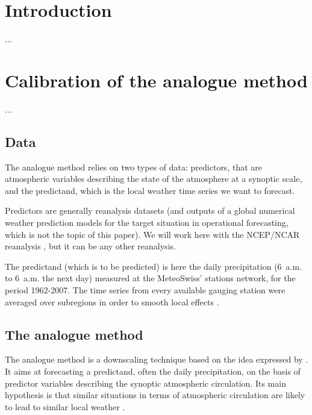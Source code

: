 \documentclass{ametsoc}
\begin{document}


\section{Introduction}
...
\cite{Horton2012a}


\section{Calibration of the analogue method}
...

\subsection{Data}

The analogue method relies on two types of data: predictors, that are atmospheric variables describing the state of the atmosphere at a synoptic scale, and the predictand, which is the local weather time series we want to forecast.

Predictors are generally reanalysis datasets (and outputs of a global numerical weather prediction models for the target situation in operational forecasting, which is not the topic of this paper). We will work here with the NCEP/NCAR reanalysis \citep[6-hourly, 17 atmospheric levels at a resolution of 2.5\degree, see][]{Kalnay1996}, but it can be any other reanalysis.

The predictand (which is to be predicted) is here the daily precipitation (6~a.m. to 6~a.m. the next day) measured at the MeteoSwiss' stations network, for the period 1962-2007. The time series from every available gauging station were averaged over subregions in order to smooth local effects \citep{Obled2002, Marty2012}.


\subsection{The analogue method}

The analogue method is a downscaling technique based on the idea expressed by \citet{Lorenz1969}. It aims at forecasting a predictand, often the daily precipitation, on the basis of predictor variables describing the synoptic atmospheric circulation. Its main hypothesis is that similar situations in terms of atmospheric circulation are likely to lead to similar local weather \citep{Bontron2005}.
\end{document}
